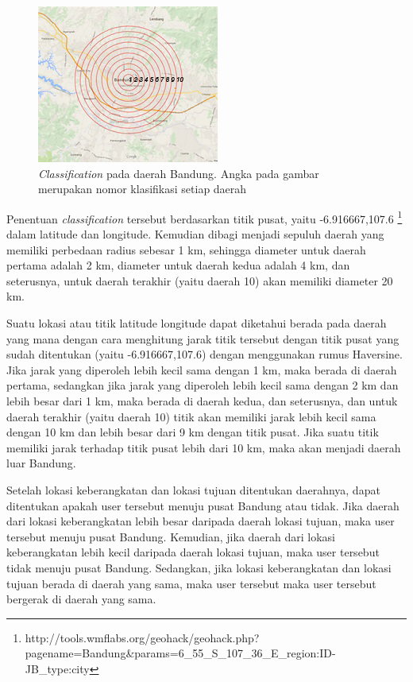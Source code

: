 \begin{figure}
\centering
\includegraphics[scale=1.5]{Gambar/classificationmap.jpg}
\caption[\textsl{Classification} pada daerah Bandung]{\textsl{Classification} pada daerah Bandung. Angka pada gambar merupakan nomor klasifikasi setiap daerah}
\label{fig:classificationMap} 
\end{figure}

Penentuan \textsl{classification} tersebut berdasarkan titik pusat, yaitu -6.916667,107.6 \footnote{http://tools.wmflabs.org/geohack/geohack.php?pagename=Bandung\&params=6\_55\_S\_107\_36\_E\_region:ID-JB\_type:city} dalam latitude dan longitude. Kemudian dibagi menjadi sepuluh daerah yang memiliki perbedaan radius sebesar 1 km, sehingga diameter untuk daerah pertama adalah 2 km, diameter untuk daerah kedua adalah 4 km, dan seterusnya, untuk daerah terakhir (yaitu daerah 10) akan memiliki diameter 20 km.

Suatu lokasi atau titik latitude longitude dapat diketahui berada pada daerah yang mana dengan cara menghitung jarak titik tersebut dengan titik pusat yang sudah ditentukan (yaitu -6.916667,107.6) dengan menggunakan rumus Haversine. Jika jarak yang diperoleh lebih kecil sama dengan 1 km, maka berada di daerah pertama, sedangkan jika jarak yang diperoleh lebih kecil sama dengan 2 km dan lebih besar dari 1 km, maka berada di daerah kedua, dan seterusnya, dan untuk daerah terakhir (yaitu daerah 10) titik akan memiliki jarak lebih kecil sama dengan 10 km dan lebih besar dari 9 km dengan titik pusat. Jika suatu titik memiliki jarak terhadap titik pusat lebih dari 10 km, maka akan menjadi daerah luar Bandung.

Setelah lokasi keberangkatan dan lokasi tujuan ditentukan daerahnya, dapat ditentukan apakah user tersebut menuju pusat Bandung atau tidak. Jika daerah dari lokasi keberangkatan lebih besar daripada daerah lokasi tujuan, maka user tersebut menuju pusat Bandung. Kemudian, jika daerah dari lokasi keberangkatan lebih kecil daripada daerah lokasi tujuan, maka user tersebut tidak menuju pusat Bandung. Sedangkan, jika lokasi keberangkatan dan lokasi tujuan berada di daerah yang sama, maka user tersebut maka user tersebut bergerak di daerah yang sama.

